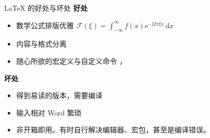 \begin{frame}[fragile]{\LaTeX{} 的好处与坏处}
    \textbf{好处}
    \begin{itemize}
        \item 数学公式排版优雅 \quad $\mathcal{F}(\xi)=\int_{-\infty}^{\infty} f(x)\mathrm{e}^{-\mathrm{j}2\pi \xi x}\,\mathrm{d}x$
        \item 内容与格式分离
        \item 随心所欲的宏定义与自定义命令 ，
    \end{itemize}

    \vspace{2em}
    \textbf{坏处}
    \begin{itemize}
        \item 得到易读的版本，需要编译
        \item 输入相对 Word 繁琐
        \item 非开箱即用。有时自行解决编辑器、宏包，甚至是编译错误。
    \end{itemize}

\end{frame}
